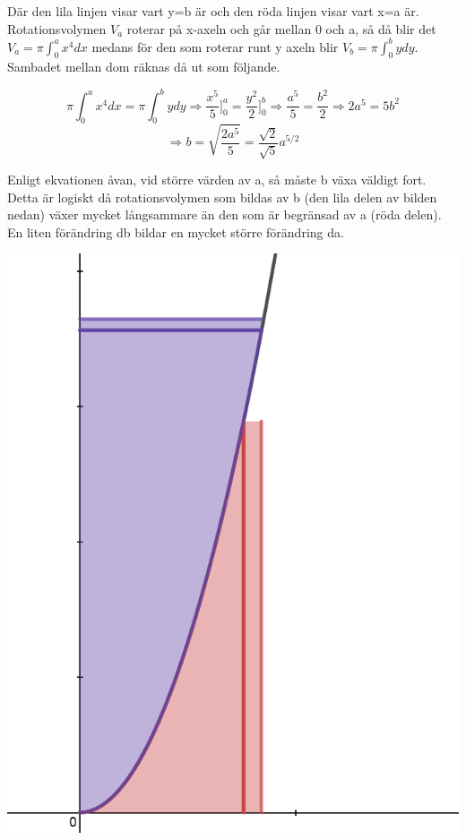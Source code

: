 \documentclass[a4paper,12pt]{article}
\begin{document}
\begin{enumerate}
    Där den lila linjen visar vart y=b är och den röda linjen
    visar vart x=a är. Rotationsvolymen $V_a$ roterar på x-axeln och går
    mellan 0 och a, så då blir det $V_a=\pi\int_0^ax^4dx$ medans för den som
    roterar runt y axeln blir $V_b=\pi\int_0^bydy$. Sambadet mellan dom räknas
    då ut som följande.

    $$\pi\int_0^ax^4dx=\pi\int_0^bydy\Rightarrow \frac{x^5}{5}]_0^a=\frac{y^2}{2}]_0^b\Rightarrow \frac{a^5}{5}=\frac{b^2}{2}\Rightarrow 2a^5=5b^2$$
    $$\Rightarrow b=\sqrt{\frac{2a^5}{5}}=\frac{\sqrt{2}}{\sqrt{5}}a^{5/2}$$

    Enligt ekvationen åvan, vid större värden av a, så måste b växa
    väldigt fort. Detta är logiskt då rotationsvolymen som bildas
    av b (den lila delen av bilden nedan) växer mycket långsammare 
    än den som är begränsad av a (röda delen). En liten förändring
    db bildar en mycket större förändring da. 

    \begin{center}
        \includegraphics[scale=0.35]{Figur 7.png}
    \end{center}


\end{enumerate}
\end{document}
